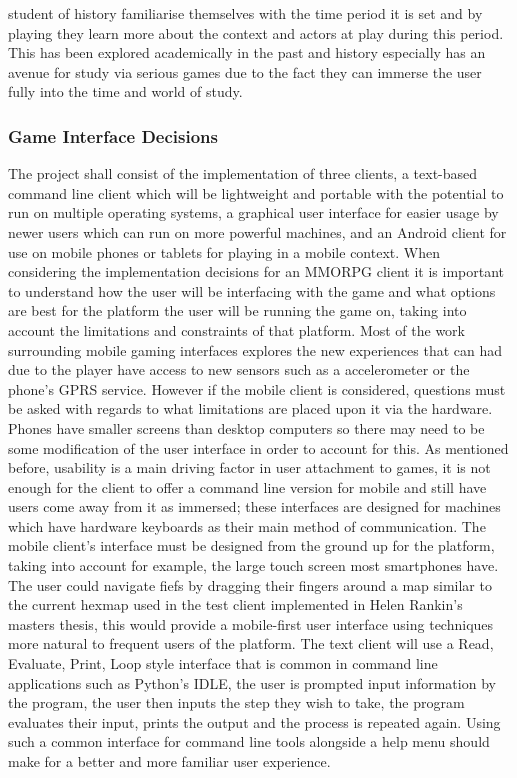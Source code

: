 \documentclass{article}
\begin{document}
student of history familiarise themselves with the time period it is set and by playing they learn more about the context and actors at play during this period. This has been explored academically in the past\cite{seriousgames} and history especially has an avenue for study via serious games due to the fact they can immerse the user fully into the time and world of study.
	\subsubsection{Game Interface Decisions}
	The project shall consist of the implementation of three clients, a text-based command line client which will be lightweight and portable with the potential to run on multiple operating systems, a graphical user interface for easier usage by newer users which can run on more powerful machines, and an Android client for use on mobile phones or tablets for playing in a mobile context. When considering the implementation decisions for an MMORPG client it is important to understand how the user will be interfacing with the game and what options are best for the platform the user will be running the game on, taking into account the limitations and constraints of that platform. Most of the work surrounding mobile gaming interfaces explores the new experiences that can had due to the player have access to new sensors such as a accelerometer or the phone's GPRS service. However if the mobile client is considered, questions must be asked with regards to what limitations are placed upon it via the hardware. Phones have smaller screens than desktop computers so there may need to be some modification of the user interface in order to account for this. As mentioned before, usability is a main driving factor in user attachment to games\cite{Christou:2012:EPP:2367616.2367630}, it is not enough for the client to offer a command line version for mobile and still have users come away from it as immersed; these interfaces are designed for machines which have hardware keyboards as their main method of communication. The mobile client's interface must be designed from the ground up for the platform, taking into account for example, the large touch screen most smartphones have. The user could navigate fiefs by dragging their fingers around a map similar to the current hexmap used in the test client implemented in Helen Rankin's masters thesis\cite{helenrankin}, this would provide a mobile-first user interface using techniques more natural to frequent users of the platform. The text client will use a Read, Evaluate, Print, Loop style interface that is common in command line applications such as Python's IDLE\cite{python}, the user is prompted input information by the program, the user then inputs the step they wish to take, the program evaluates their input, prints the output and the process is repeated again. Using such a common interface for command line tools alongside a help menu should make for a better and more familiar user experience.
\end{document}
